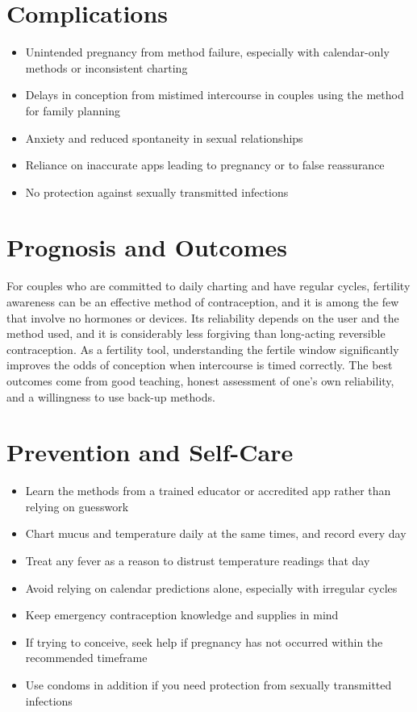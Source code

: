 \section*{Complications}
\begin{itemize}
    \item Unintended pregnancy from method failure, especially with calendar-only methods or inconsistent charting
    \item Delays in conception from mistimed intercourse in couples using the method for family planning
    \item Anxiety and reduced spontaneity in sexual relationships
    \item Reliance on inaccurate apps leading to pregnancy or to false reassurance
    \item No protection against sexually transmitted infections
\end{itemize}

\section*{Prognosis and Outcomes}
For couples who are committed to daily charting and have regular cycles, fertility awareness can be an effective method of contraception, and it is among the few that involve no hormones or devices. Its reliability depends on the user and the method used, and it is considerably less forgiving than long-acting reversible contraception. As a fertility tool, understanding the fertile window significantly improves the odds of conception when intercourse is timed correctly. The best outcomes come from good teaching, honest assessment of one's own reliability, and a willingness to use back-up methods.

\section*{Prevention and Self-Care}
\begin{itemize}
    \item Learn the methods from a trained educator or accredited app rather than relying on guesswork
    \item Chart mucus and temperature daily at the same times, and record every day
    \item Treat any fever as a reason to distrust temperature readings that day
    \item Avoid relying on calendar predictions alone, especially with irregular cycles
    \item Keep emergency contraception knowledge and supplies in mind
    \item If trying to conceive, seek help if pregnancy has not occurred within the recommended timeframe
    \item Use condoms in addition if you need protection from sexually transmitted infections
\end{itemize}

